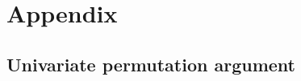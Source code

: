 \documentclass[11pt]{article}
\theoremstyle{definition}
\theoremstyle{remark}
\begin{document}







\appendix
\section{Appendix}
\label{s:Appendix}

\subsection{Univariate permutation argument}
\label{s:uv:pa}
\end{document}
